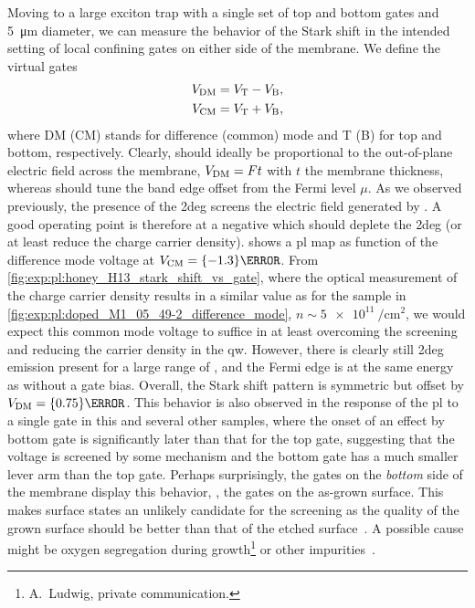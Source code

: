 Moving to a large exciton trap with a single set of top and bottom gates and \qty{5}{\micro\meter} diameter, we can measure the behavior of the Stark shift in the intended setting of local confining gates on either side of the membrane.
We define the virtual gates
\begin{align}\label{eq:exp:observations:virtual_gates}
    V_{\mathrm{DM}} &= V_{\mathrm{T}} - V_{\mathrm{B}}, \\
    V_{\mathrm{CM}} &= V_{\mathrm{T}} + V_{\mathrm{B}},
\end{align}
where DM (CM) stands for difference (common) mode and T (B) for top and bottom, respectively.
Clearly, \VDM should ideally be proportional to the out-of-plane electric field across the membrane, $V_{\mathrm{DM}} = Ft$ with $t$ the membrane thickness, whereas \VCM should tune the band edge offset from the Fermi level $\mu$.
As we observed previously, the presence of the \gls{2deg} screens the electric field generated by \VDM.
A good operating point is therefore at a negative \VCM which should deplete the \gls{2deg} (or at least reduce the charge carrier density).
 shows a \gls{pl} map as function of the difference mode voltage \VDM at $\VCM = \qty{-1.3}{\volt}$.
From \cref{fig:exp:pl:honey_H13_stark_shift_vs_gate}, where the optical measurement of the charge carrier density results in a similar value as for the sample in \cref{fig:exp:pl:doped_M1_05_49-2_difference_mode}, $n\sim\qty{5e11}{\per\centi\meter\squared}$, we would expect this common mode voltage to suffice in at least overcoming the screening and reducing the carrier density in the \gls{qw}.
However, there is clearly still \gls{2deg} emission present for a large range of \VDM, and the Fermi edge is at the same energy as without a gate bias.
Overall, the Stark shift pattern is symmetric but offset by $\VDM = \qty{0.75}{\volt}$.
This behavior is also observed in the response of the \gls{pl} to a single gate in this and several other samples, where the onset of an effect by bottom gate is significantly later than that for the top gate, suggesting that the voltage is screened by some mechanism and the bottom gate has a much smaller lever arm than the top gate.
Perhaps surprisingly, the gates on the \emph{bottom} side of the membrane display this behavior, \ie, the gates on the as-grown surface.
This makes surface states an unlikely candidate for the screening as the quality of the grown surface should be better than that of the etched surface~\cite{Descamps2021}.
A possible cause might be oxygen segregation during growth\footnote{A.~Ludwig, private communication.} or other impurities~\cite{Nguyen2020}.

